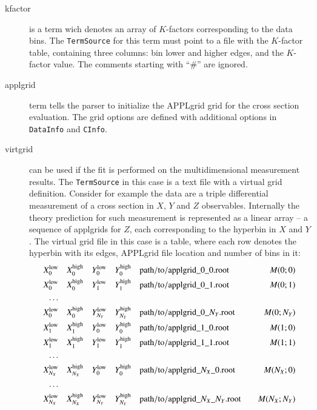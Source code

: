 \begin{description}
\item[kfactor] is a term wich denotes an array of \(K\)-factors corresponding
  to the data bins. The {\tt TermSource} for this term must point to a file with the 
  \(K\)-factor table, containing three columns: bin lower and higher edges, and the
  \(K\)-factor value. The comments starting with ``\#'' are ignored.
\item[applgrid] term tells the parser to initialize the APPLgrid grid for the
  cross section evaluation. The grid options are defined with additional options
  in {\tt DataInfo} and {\tt CInfo}.
\item[virtgrid] can be used if the fit is performed on the multidimensional 
  measurement results. The {\tt TermSource} in this case is a text file with a virtual
  grid definition. Consider for example the data are
  a triple differential measurement of a cross section in \(X\), \(Y\) and \(Z\)
  observables. Internally the theory prediction for such measurement is
  represented as a linear array -- a sequence of applgrids for \(Z\), each
  corresponding to the hyperbin in \(X\) and \(Y\). The virtual grid file in 
  this case is a table, where each row denotes the hyperbin with its edges,
  APPLgrid file location and number of bins in it:
  \begin{align*}
  X_0^{\mrlow} &\quad X_0^{\mrhigh} \quad Y_0^{\mrlow} \quad Y_0^{\mrhigh} \quad {\mrpa}\_0\_0{\mrdrt} &\quad M(0;0) \\
  X_0^{\mrlow} &\quad X_0^{\mrhigh} \quad Y_1^{\mrlow} \quad Y_1^{\mrhigh} \quad {\mrpa}\_0\_1{\mrdrt} &\quad M(0;1) \\
  \ldots \\
  X_0^{\mrlow} &\quad X_0^{\mrhigh} \quad Y_{N_Y}^{\mrlow} \quad Y_{N_Y}^{\mrhigh} \quad {\mrpa}\_0\_N_Y{\mrdrt} &\quad M(0;N_Y) \\
  X_1^{\mrlow} &\quad X_1^{\mrhigh} \quad Y_{0}^{\mrlow} \quad Y_{0}^{\mrhigh} \quad {\mrpa}\_1\_0{\mrdrt} &\quad M(1;0) \\
  X_1^{\mrlow} &\quad X_1^{\mrhigh} \quad Y_{1}^{\mrlow} \quad Y_{1}^{\mrhigh} \quad {\mrpa}\_1\_1{\mrdrt} &\quad M(1;1) \\
  \ldots \\
  X_{N_X}^{\mrlow} &\quad X_{N_X}^{\mrhigh} \quad Y_{0}^{\mrlow} \quad Y_{0}^{\mrhigh} \quad {\mrpa}\_N_X\_0{\mrdrt} &\quad M(N_X;0) \\
  \ldots \\
  X_{N_X}^{\mrlow} &\quad X_{N_X}^{\mrhigh} \quad Y_{N_Y}^{\mrlow} \quad Y_{N_Y}^{\mrhigh} \quad {\mrpa}\_N_X\_N_Y{\mrdrt} &\quad M(N_X;N_Y) \\

\end{align*}
\end{description}
